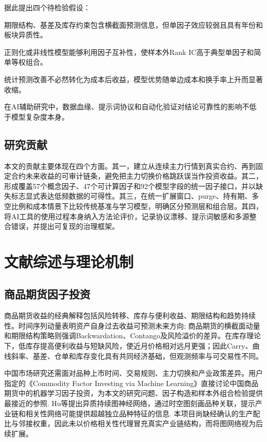 \documentclass[UTF8,zihao=-4,fontset=ubuntu]{ctexart}
\begin{document}
据此提出四个待检验假设：

\begin{description}[leftmargin=2.5cm,style=nextline]
\item[H1：弱信号假设] 期限结构、基差及库存约束包含横截面预测信息，但单因子效应较弱且具有年份和板块异质性。
\item[H2：组合改善假设] 正则化或非线性模型能够利用因子互补性，使样本外Rank IC高于典型单因子和简单等权组合。
\item[H3：成本侵蚀假设] 统计预测改善不必然转化为成本后收益，模型优势随单边成本和换手率上升而显著收缩。
\item[H4：治理约束假设] 在AI辅助研究中，数据血缘、提示词协议和自动化验证对结论可靠性的影响不低于模型复杂度本身。
\end{description}

\subsection{研究贡献}

本文的贡献主要体现在四个方面。其一，建立从连续主力行情到真实合约、再到固定合约未来收益的可审计链条，避免把主力切换价格跳跃误当作投资收益。其二，形成覆盖57个概念因子、47个可计算因子和92个模型字段的统一因子接口，并以缺失标志显式表达低频数据的可得性。其三，在统一扩展窗口、purge、持有期、多空比例和成本情景下比较传统基准与学习模型，明确区分预测层和组合层。其四，将AI工具的使用过程本身纳入方法论评价，记录协议漂移、提示词敏感和多源整合错误，并提出可复现的治理框架。

\section{文献综述与理论机制}

\subsection{商品期货因子投资}

商品期货收益的经典解释包括风险转移、库存与便利收益、期限结构和趋势持续性。时间序列动量表明资产自身过去收益可预测未来方向\cite{moskowitz2012}; 商品期货的横截面动量和期限结构策略则强调Backwardation、Contango及风险溢价的差异\cite{miffre2007,ergb2013,gorton2013}。在库存理论下，低库存提高便利收益与短缺风险，使近月价格相对远月更强；因此Carry、曲线斜率、基差、仓单和库存变化具有共同经济基础，但观测频率与可交易性不同。

中国市场研究还需面对品种上市时间、交易规则、主力切换和产业政策差异。用户指定的《Commodity Factor Investing via Machine Learning》直接讨论中国商品期货中的机器学习因子投资，为本文的研究问题、因子构造和样本外组合检验提供最接近的参照\cite{commodityML}. Hu等提出异质持续图神经网络，通过时空图刻画品种关联，提示产业链和相关性网络可能提供超越独立品种特征的信息\cite{hu2023}. 本项目尚缺经确认的生产配比与邻接权重，因此未以价格相关性代理冒充真实产业链结构，而将图网络视为后续扩展。
\end{document}
